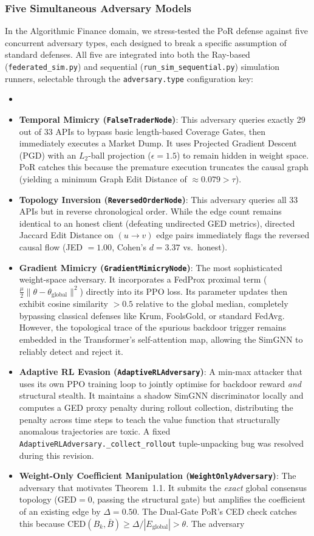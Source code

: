 \documentclass[journal]{IEEEtran}
\begin{document}
\subsubsection{Five Simultaneous Adversary Models}
In the Algorithmic Finance domain, we stress-tested the PoR defense against five concurrent adversary types, each designed to break a specific assumption of standard defenses. All five are integrated into both the Ray-based (\texttt{federated\_sim.py}) and sequential (\texttt{run\_sim\_sequential.py}) simulation runners, selectable through the \texttt{adversary.type} configuration key:
\begin{itemize}
\item  \item \textbf{Temporal Mimicry (\texttt{FalseTraderNode})}: This adversary queries exactly 29 out of 33 APIs to bypass basic length-based Coverage Gates, then immediately executes a Market Dump. It uses Projected Gradient Descent (PGD) with an $L_2$-ball projection ($\epsilon=1.5$) to remain hidden in weight space. PoR catches this because the premature execution truncates the causal graph (yielding a minimum Graph Edit Distance of $\approx 0.079 > \tau$). \item \textbf{Topology Inversion (\texttt{ReversedOrderNode})}: This adversary queries all 33 APIs but in reverse chronological order. While the edge count remains identical to an honest client (defeating undirected GED metrics), directed Jaccard Edit Distance on $(u \to v)$ edge pairs immediately flags the reversed causal flow (JED $= 1.00$, Cohen's $d = 3.37$ vs.\ honest). \item \textbf{Gradient Mimicry (\texttt{GradientMimicryNode})}: The most sophisticated weight-space adversary. It incorporates a FedProx \cite{li2020fedprox} proximal term ($\frac{\mu}{2} \| \theta - \theta_{\text{global}} \|^2$) directly into its PPO loss. Its parameter updates then exhibit cosine similarity $> 0.5$ relative to the global median, completely bypassing classical defenses like Krum, FoolsGold, or standard FedAvg. However, the topological trace of the spurious backdoor trigger remains embedded in the Transformer's self-attention map, allowing the SimGNN to reliably detect and reject it. \item \textbf{Adaptive RL Evasion (\texttt{AdaptiveRLAdversary})}: A min-max attacker that uses its own PPO training loop to jointly optimise for backdoor reward \emph{and} structural stealth. It maintains a shadow SimGNN discriminator locally and computes a GED proxy penalty during rollout collection, distributing the penalty across time steps to teach the value function that structurally anomalous trajectories are toxic. A fixed \texttt{AdaptiveRLAdversary.\_collect\_rollout} tuple-unpacking bug was resolved during this revision. \item \textbf{Weight-Only Coefficient Manipulation (\texttt{WeightOnlyAdversary})}: The adversary that motivates Theorem~1.1. It submits the \emph{exact} global consensus topology ($\text{GED}=0$, passing the structural gate) but amplifies the coefficient of an existing edge by $\Delta = 0.50$. The Dual-Gate PoR's CED check catches this because $\text{CED}(B_k, \bar{B}) \geq \Delta / |E_{\text{global}}| > \theta$. The adversary 
\end{itemize}
\end{document}
